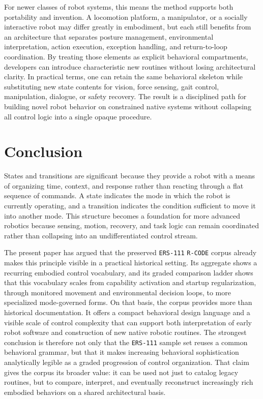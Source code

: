 \documentclass[11pt]{article}
\begin{document}
For newer classes of robot systems, this means the method supports both
portability and invention. A locomotion platform, a manipulator, or a
socially interactive robot may differ greatly in embodiment, but each
still benefits from an architecture that separates posture management,
environmental interpretation, action execution, exception handling, and
return-to-loop coordination. By treating those elements as explicit
behavioral compartments, developers can introduce characteristic new
routines without losing architectural clarity. In practical terms, one
can retain the same behavioral skeleton while substituting new state
contents for vision, force sensing, gait control, manipulation,
dialogue, or safety recovery. The result is a disciplined path for
building novel robot behavior on constrained native systems without
collapsing all control logic into a single opaque procedure.

\section*{Conclusion}

States and transitions are significant because they provide a robot
with a means of organizing time, context, and response rather than
reacting through a flat sequence of commands. A state indicates the
mode in which the robot is currently operating, and a transition
indicates the condition sufficient to move it into another mode. This
structure becomes a foundation for more advanced robotics because
sensing, motion, recovery, and task logic can remain coordinated rather
than collapsing into an undifferentiated control stream.

The present paper has argued that the preserved \texttt{ERS-111}
\texttt{R-CODE} corpus already makes this principle visible in a
practical historical setting. Its aggregate shows a recurring embodied
control vocabulary, and its graded comparison ladder shows that this
vocabulary scales from capability activation and startup
regularization, through monitored movement and environmental decision
loops, to more specialized mode-governed forms. On that basis, the
corpus provides more than historical documentation. It offers a compact
behavioral design language and a visible scale of control complexity
that can support both interpretation of early robot software and
construction of new native robotic routines. The strongest conclusion
is therefore not only that the \texttt{ERS-111} sample set reuses a
common behavioral grammar, but that it makes increasing behavioral
sophistication analytically legible as a graded progression of control
organization. That claim gives the corpus its broader value: it can be
used not just to catalog legacy routines, but to compare, interpret,
and eventually reconstruct increasingly rich embodied behaviors on a
shared architectural basis.

\vspace{-0.5\baselineskip}


\end{document}
